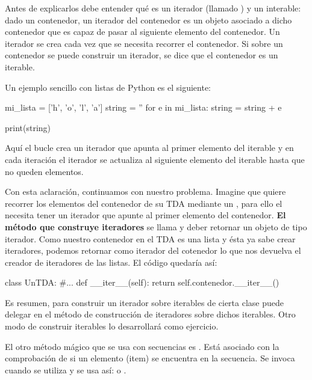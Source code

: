 \begin{itemize}
Antes de  explicarlos debe entender qué es un iterador (llamado ) y un interable: dado un contenedor, un iterador del contenedor es un objeto asociado a dicho contenedor que es capaz de pasar al siguiente elemento del contenedor. Un iterador se crea cada vez que se necesita recorrer el contenedor. Si sobre un contenedor se puede construir un iterador, se dice que el contenedor es un iterable.

Un ejemplo sencillo con listas de Python es el siguiente:
\begin{pyconsole}[][frame=single]
mi_lista = ['h', 'o', 'l', 'a']
string = ''
for e in mi_lista:
  string = string + e

print(string)

\end{pyconsole} 
Aquí el bucle  crea un iterador que apunta al primer elemento del iterable 
y en cada iteración el iterador se actualiza al siguiente elemento del iterable
hasta que no queden elementos.

Con esta aclaración, continuamos con nuestro problema. Imagine que quiere recorrer los elementos del contenedor  de su TDA mediante un , para ello el  necesita tener un iterador que apunte al primer elemento del contenedor. \textbf{El método que construye iteradores} se llama  y deber retornar un objeto de tipo  iterador. Como nuestro contenedor en el TDA es una lista y ésta ya sabe crear iteradores, podemos retornar como iterador del cotenedor lo que nos devuelva el creador de iteradores de las listas. El código quedaría así:

\hfil
\begin{minipage}{.55\textwidth}
\begin{pyconsole}[][frame=single]
class UnTDA:
   #...
   def __iter__(self):
      return self.contenedor.__iter__()

\end{pyconsole}
\end{minipage}

Es resumen, para construir un iterador sobre iterables de cierta clase  puede delegar en el método de construcción de iteradores sobre dichos iterables. Otro modo de construir iterables lo desarrollará como ejercicio.



El otro método mágico que se usa con secuencias es .
Está asociado con la comprobación de si un elemento (item) se encuentra en la secuencia.
Se invoca cuando se utiliza  y se usa así:
 o .


\end{itemize}
